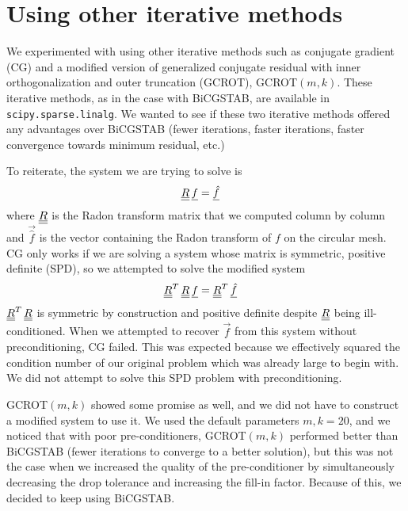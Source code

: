 
\section*{Using other iterative methods}
We experimented with using other iterative methods such as conjugate gradient (CG) and a modified version of generalized conjugate residual with inner orthogonalization and outer truncation (GCROT), GCROT$(m, k)$.
These iterative methods, as in the case with BiCGSTAB, are available in \verb|scipy.sparse.linalg|.
We wanted to see if these two iterative methods offered any advantages over BiCGSTAB (fewer iterations, faster iterations, faster convergence towards minimum residual, etc.)
\par 
To reiterate, the system we are trying to solve is 
\begin{align*}
	{\underline{\underline{R}}} \, {\underline{f}} & = {\underline{\hat{f}}}
\end{align*}
where ${\underline{\underline{R}}}$ is the Radon transform matrix that we computed column by column and $\vec{\hat{f}}$ is the vector containing the Radon transform of $f$ on the circular mesh.
CG only works if we are solving a system whose matrix is symmetric, positive definite (SPD), so we attempted to solve the modified system
\begin{align*}
	{\underline{\underline{R}}}^{T} \, {\underline{\underline{R}}} \, {\underline{f}} & = {\underline{\underline{R}}}^{T} \, {\underline{\hat{f}}}
\end{align*}
${\underline{\underline{R}}}^{T} \, {\underline{\underline{R}}}$ is symmetric by construction and positive definite despite ${\underline{\underline{R}}}$ being ill-conditioned.
When we attempted to recover $\vec{f}$ from this system without preconditioning, CG failed. 
This was expected because we effectively squared the condition number of our original problem which was already large to begin with.
We did not attempt to solve this SPD problem with preconditioning.
\par 
GCROT$(m, k)$ showed some promise as well, and we did not have to construct a modified system to use it.
We used the default parameters $m, k = 20$, and we noticed that with poor pre-conditioners, GCROT$(m, k)$ performed better than BiCGSTAB (fewer iterations to converge to a better solution), but this was not the case when we increased the quality of the pre-conditioner by simultaneously decreasing the drop tolerance and increasing the fill-in factor.
Because of this, we decided to keep using BiCGSTAB.